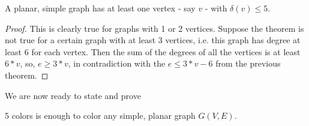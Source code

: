  \begin{theorem} A planar, simple graph has at least one
 vertex - say $v$ - with $\delta(v) \leq 5$.
\end{theorem}
\begin{proof}
This is clearly true for graphs with 1 or 2 vertices. Suppose the
theorem is not true for a certain graph with at least 3 vertices,
i.e. this graph has degree at least 6 for each vertex. Then the sum of
the degrees of all the vertices is at least $6*v$, so, $e \geq 3*v$,
in contradiction with the $e \leq 3*v-6$ from the previous theorem.
\end{proof}

We are now ready to state and prove

 \begin{theorem} 5 colors is enough to color any simple,
     planar graph $G(V,E)$.
\end{theorem} %
